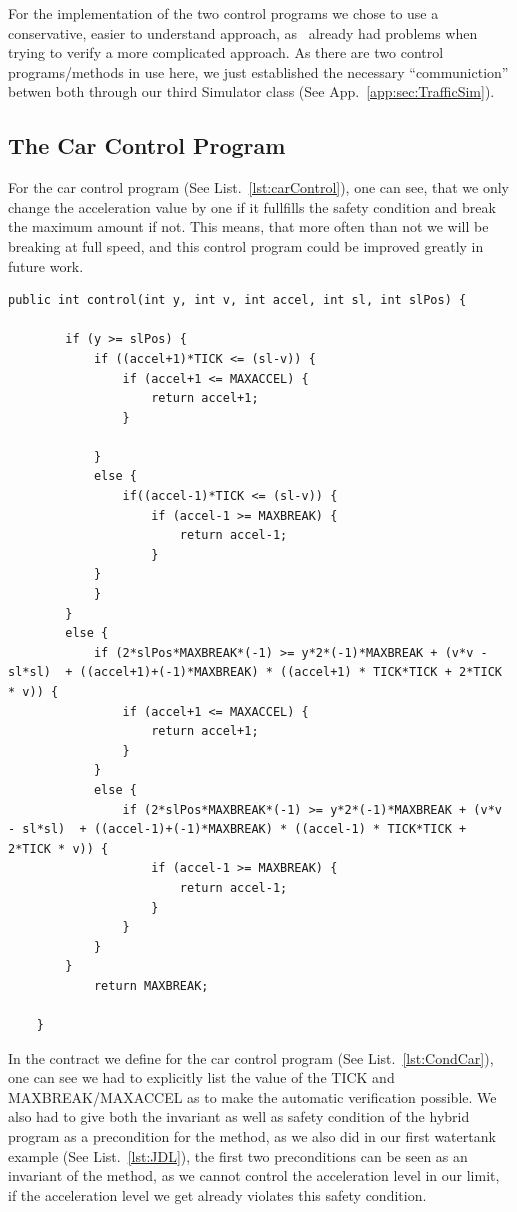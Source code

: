 For the implementation of the two control programs we chose to use a conservative, easier to understand approach, as \key~already had problems when trying to verify a more complicated approach. As there are two control programs/methods in use here, we just established the necessary ``communiction'' betwen both through our third Simulator class (See App.~\ref{app:sec:TrafficSim}). 

\subsection{The Car Control Program}
\label{subsec:traffic:car}
For the car control program (See List.~\ref{lst:carControl}), one can see, that we only change the acceleration value by one if it fullfills the safety condition and break the maximum amount if not. This means, that more often than not we will be breaking at full speed,  and this control program could be improved greatly in future work. 

\begin{lstlisting}[label=lst:carControl]
	public int control(int y, int v, int accel, int sl, int slPos) {
		
		if (y >= slPos) {
			if ((accel+1)*TICK <= (sl-v)) {
				if (accel+1 <= MAXACCEL) {
					return accel+1;
				}
				
			}
			else {
				if((accel-1)*TICK <= (sl-v)) {
					if (accel-1 >= MAXBREAK) {
						return accel-1;
					}
			}
			}
		}
		else {
			if (2*slPos*MAXBREAK*(-1) >= y*2*(-1)*MAXBREAK + (v*v - sl*sl)  + ((accel+1)+(-1)*MAXBREAK) * ((accel+1) * TICK*TICK + 2*TICK * v)) {
				if (accel+1 <= MAXACCEL) {
					return accel+1;
				}
			}
			else {
				if (2*slPos*MAXBREAK*(-1) >= y*2*(-1)*MAXBREAK + (v*v - sl*sl)  + ((accel-1)+(-1)*MAXBREAK) * ((accel-1) * TICK*TICK + 2*TICK * v)) {
					if (accel-1 >= MAXBREAK) {
						return accel-1;
					}
				}
			}
		}
			return MAXBREAK;
		
	}
\end{lstlisting}

In the contract we define for the car control program (See List.~\ref{lst:CondCar}),  one can see we had to explicitly list the value of the TICK and MAXBREAK/MAXACCEL as to make the automatic verification possible. We also had to give both the invariant as well as safety condition of the hybrid program as a precondition for the method, as we also did in our first watertank example (See List.~\ref{lst:JDL}), the first two preconditions can be seen as an invariant of the method, as we cannot control the acceleration level in our limit, if the acceleration level we get already violates this safety condition.


